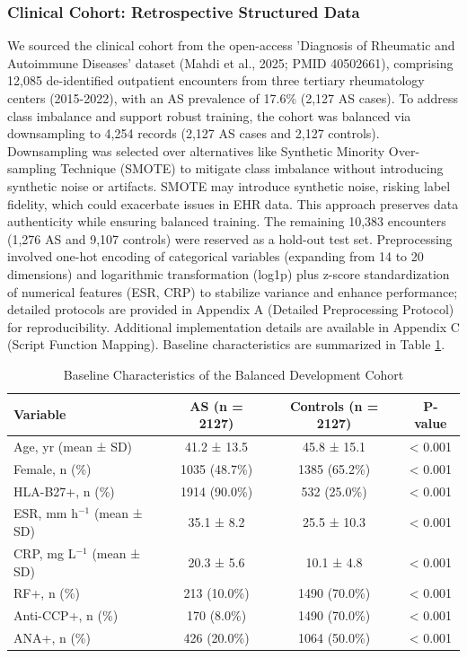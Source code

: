 \documentclass[12pt, a4paper]{article}
\begin{document}
\subsubsection{Clinical Cohort: Retrospective Structured Data}
We sourced the clinical cohort from the open-access ’Diagnosis of Rheumatic and Autoimmune Diseases’ dataset (Mahdi et al., 2025; PMID 40502661), comprising 12,085 de-identified outpatient encounters from three tertiary rheumatology centers (2015-2022), with an AS prevalence of 17.6\% (2,127 AS cases). To address class imbalance and support robust training, the cohort was balanced via downsampling to 4,254 records (2,127 AS cases and 2,127 controls). Downsampling was selected over alternatives like Synthetic Minority Over-sampling Technique (SMOTE) to mitigate class imbalance without introducing synthetic noise or artifacts. SMOTE may introduce synthetic noise, risking label fidelity, which could exacerbate issues in EHR data. This approach preserves data authenticity while ensuring balanced training. The remaining 10,383 encounters (1,276 AS and 9,107 controls) were reserved as a hold-out test set. Preprocessing involved one-hot encoding of categorical variables (expanding from 14 to 20 dimensions) and logarithmic transformation (log1p) plus z-score standardization of numerical features (ESR, CRP) to stabilize variance and enhance performance; detailed protocols are provided in Appendix A (Detailed Preprocessing Protocol) for reproducibility. Additional implementation details are available in Appendix C (Script Function Mapping). Baseline characteristics are summarized in Table \ref{tab:baseline}.
\begin{table}[H]
\centering
\normalsize
\caption{Baseline Characteristics of the Balanced Development Cohort}
\label{tab:baseline}
\begin{tabular}{@{}lccc@{}}
\toprule
\textbf{Variable} & \textbf{AS (n = 2127)} & \textbf{Controls (n = 2127)} & \textbf{P-value} \\
\midrule
Age, yr (mean ± SD) & 41.2 ± 13.5 & 45.8 ± 15.1 & < 0.001 \\
Female, n (\%) & 1035 (48.7\%) & 1385 (65.2\%) & < 0.001 \\
HLA-B27+, n (\%) & 1914 (90.0\%) & 532 (25.0\%) & < 0.001 \\
ESR, mm h$^{-1}$ (mean ± SD) & 35.1 ± 8.2 & 25.5 ± 10.3 & < 0.001 \\
CRP, mg L$^{-1}$ (mean ± SD) & 20.3 ± 5.6 & 10.1 ± 4.8 & < 0.001 \\
RF+, n (\%) & 213 (10.0\%) & 1490 (70.0\%) & < 0.001 \\
Anti-CCP+, n (\%) & 170 (8.0\%) & 1490 (70.0\%) & < 0.001 \\
ANA+, n (\%) & 426 (20.0\%) & 1064 (50.0\%) & < 0.001 \\
\bottomrule
\end{tabular}
\end{table}
\end{document}
